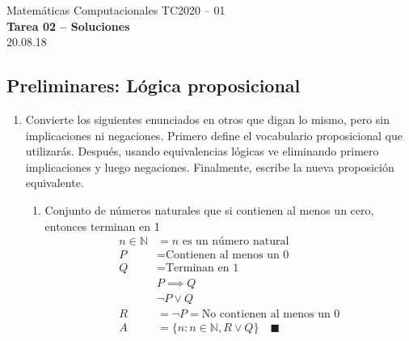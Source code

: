 \documentclass[]{book}
\theoremstyle{definition}
\begin{document}
\begin{center}
{\huge Matemáticas Computacionales TC2020 -- 01}\\[1.5ex]
{\large \textbf{Tarea 02 -- Soluciones}\\[1.5ex] %
20.08.18} %
\end{center}

\vspace{0.2 cm}

\subsection*{Preliminares: Lógica proposicional}

\begin{enumerate}
	\itemsep0.35in

	\item Convierte los siguientes enunciados en otros que digan lo mismo, pero sin implicaciones ni negaciones.
	Primero define el vocabulario proposicional que utilizarás. Después, usando equivalencias lógicas ve eliminando primero implicaciones y luego negaciones.
	Finalmente, escribe la nueva proposición equivalente.
	\begin{enumerate}
        \item Conjunto de números naturales que si contienen al menos un cero, entonces terminan en 1
        \begin{align*}
            n \in \mathbb{N} & = n \text{ es un número natural}\\
            P & = \text{Contienen al menos un 0}\\
            Q & = \text{Terminan en 1}\\[2ex]
            & P \implies Q\\
            & \neg P \vee Q\\[2ex]
            R & = \neg P = \text{No contienen al menos un 0}\\
            A & = \{n : n \in \mathbb{N}, R \vee Q\} \quad \blacksquare
        \end{align*}
        

\end{enumerate}
\end{enumerate}
\end{document}
